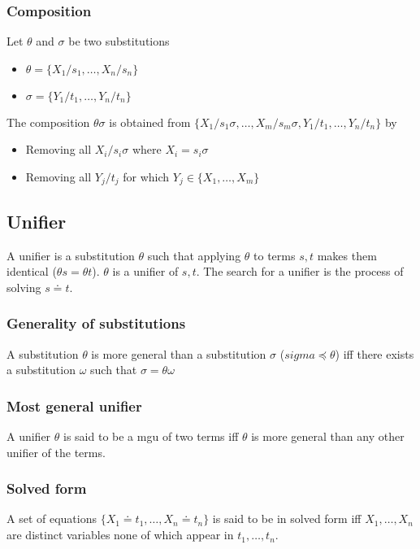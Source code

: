 \documentclass{article}
\begin{document}
\subsubsection{Composition}
Let $\theta$ and $\sigma$ be two substitutions
\begin{itemize}
    \item $\theta=\{X_1/s_1,\ldots,X_n/s_n\}$
    \item $\sigma=\{Y_1/t_1,\ldots,Y_n/t_n\}$
\end{itemize}
The composition $\theta\sigma$ is obtained from $\{X_1/s_1\sigma,\ldots,X_m/s_m\sigma, Y_1/t_1,\ldots,Y_n/t_n\}$ by
\begin{itemize}
    \item Removing all $X_i/s_i\sigma$ where $X_i=s_i\sigma$
    \item Removing all $Y_j/t_j$ for which $Y_j\in\{X_1,\ldots,X_m\}$
\end{itemize}

\subsection{Unifier}

A unifier is a substitution $\theta$ such that applying $\theta$ to terms $s, t$ makes them identical ($\theta s=\theta t$). $\theta$ is a unifier of $s, t$. The search for a unifier is the process of solving $s \doteq t$.


\subsubsection{Generality of substitutions}
A substitution $\theta$ is more general than a substitution $\sigma$ ($sigma\preceq\theta$) iff there exists a substitution $\omega$ such that $\sigma=\theta\omega$

\subsubsection{Most general unifier}
A unifier $\theta$ is said to be a mgu of two terms iff $\theta$ is more general than any other unifier of the terms.

\subsubsection{Solved form}
A set of equations $\{X_1\doteq t_1,\ldots,X_n\doteq t_n\}$ is said to be in solved form iff $X_1,\ldots,X_n$ are distinct variables none of which appear in $t_1,\ldots,t_n$.
\end{document}
